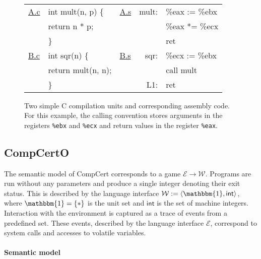 \documentclass[sigplan,screen,review]{acmart}
\newcommand{\figsize}{\small}
\newcommand{\kw}[1]{\ensuremath{ \mathsf{#1} }}
\begin{document}
\begin{figure} %
  \figsize
  \tt
  \begin{tabular}{ll lr@{\ }l}
    \hline
    \underline{A.c} & int mult(n, p) \{ &
    \underline{A.s} & mult: & \%eax := \%ebx \\
                    & \quad return n * p; &
                    & & \%eax *= \%ecx \\
                    & \} &
                    & & ret \\
    \hline
    \underline{B.c} & int sqr(n) \{ &
    \underline{B.s} & sqr: & \%ecx := \%ebx \\
                    & \quad return mult(n, n); &
                    & & call mult \\
                    & \} &
                    & L1: & ret \\
    \hline
  \end{tabular}
  \caption{Two simple C compilation units and corresponding assembly code.
    For this example,
    the calling convention stores arguments in
    the registers
    \texttt{\%ebx} and \texttt{\%ecx}
    and return values in
    the register
    \texttt{\%eax}.}
  \label{fig:abc}
\end{figure}



\subsection{CompCertO} \label{sec:mainideas:compcerto} %

The semantic model of CompCert corresponds to
a game $\mathcal{E} \rightarrow \mathcal{W}$.
Programs are run without any parameters
and produce a single integer denoting their exit status.
This is described by the language interface
$\mathcal{W} := \langle \mathbbm{1}, \kw{int} \rangle$,
where $\mathbbm{1} = \{ * \}$ is the unit set
and $\kw{int}$ is the set of machine integers.
Interaction with the environment
is captured as a trace of events from a predefined set.
These events,
described by the language interface $\mathcal{E}$,
correspond to system calls and accesses to volatile variables.

\paragraph{Semantic model} %
\end{document}

